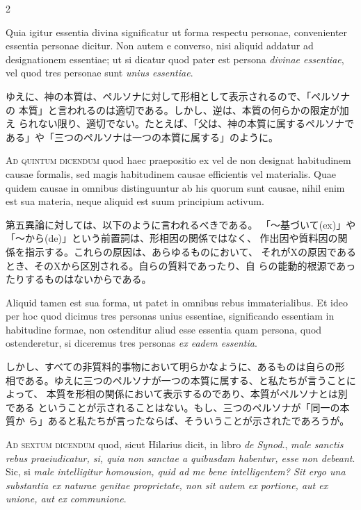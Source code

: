 \documentclass[paper=a4paper,fontsize=10pt,jafontsize=9pt,titlepage]{jlreq}
\begin{document}
\begin{paracol}{2}
\switchcolumn*

Quia igitur essentia divina significatur
ut forma respectu personae, convenienter essentia personae dicitur. Non
autem e converso, nisi aliquid addatur ad designationem essentiae; ut si
dicatur quod pater est persona {\itshape divinae essentiae}, vel quod tres personae
sunt {\itshape unius essentiae}.

\switchcolumn

ゆえに、神の本質は、ペルソナに対して形相として表示されるので、「ペルソナの
 本質」と言われるのは適切である。しかし、逆は、本質の何らかの限定が加え
 られない限り、適切でない。たとえば、「父は、神の本質に属するペルソナで
 ある」や「三つのペルソナは一つの本質に属する」のように。

\switchcolumn*

{\scshape Ad quintum dicendum} quod haec praepositio ex vel de non designat
habitudinem causae formalis, sed magis habitudinem causae efficientis
vel materialis. Quae quidem causae in omnibus distinguuntur ab his
quorum sunt causae, nihil enim est sua materia, neque aliquid est suum
principium activum.

\switchcolumn

第五異論に対しては、以下のように言われるべきである。
「〜基づいて(ex)」や「〜から(de)」という前置詞は、形相因の関係ではなく、
 作出因や質料因の関係を指示する。これらの原因は、あらゆるものにおいて、
 それがXの原因であるとき、そのXから区別される。自らの質料であったり、自
 らの能動的根源であったりするものはないからである。

\switchcolumn*

Aliquid tamen est sua forma, ut patet in omnibus
rebus immaterialibus. Et ideo per hoc quod dicimus tres personas unius
essentiae, significando essentiam in habitudine formae, non ostenditur
aliud esse essentia quam persona, quod ostenderetur, si diceremus tres
personas {\itshape ex eadem essentia}.

\switchcolumn

しかし、すべての非質料的事物において明らかなように、あるものは自らの形
 相である。ゆえに三つのペルソナが一つの本質に属する、と私たちが言うことによって、
 本質を形相の関係において表示するのであり、本質がペルソナとは別である
 ということが示されることはない。もし、三つのペルソナが「同一の本質か
 ら」あると私たちが言ったならば、そういうことが示されたであろうが。

\switchcolumn*

{\scshape Ad sextum dicendum} quod, sicut Hilarius dicit, in libro {\itshape de Synod}., {\itshape male
sanctis rebus praeiudicatur, si, quia non sanctae a quibusdam habentur,
esse non debeant}. Sic, si {\itshape male intelligitur homousion, quid ad me bene
intelligentem? Sit ergo una substantia ex naturae genitae proprietate,
non sit autem ex portione, aut ex unione, aut ex communione}.


\end{paracol}
\end{document}

